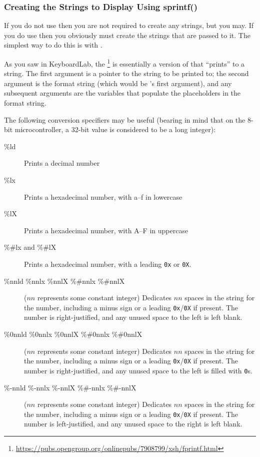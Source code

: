 \subsubsection{Creating the Strings to Display Using sprintf()}

If you do not use  then you are not required to create any strings, but you may.
If you do use  then you obviously must create the strings that are passed to it.
The simplest way to do this is with .

As you saw in KeyboardLab, the \footnote{\url{https://pubs.opengroup.org/onlinepubs/7908799/xsh/fprintf.html}} is essentially a version of  that ``prints'' to a string.
The first argument is a pointer to the string to be printed to; the second argument is the format string (which would be 's first argument), and any subsequent arguments are the variables that populate the placeholders in the format string.

The following conversion specifiers may be useful (bearing in mind that on the 8-bit microcontroller, a 32-bit value is considered to be a long integer):
\begin{description}
    \item[\%ld] Prints a decimal number
    \item[\%lx] Prints a hexadecimal number, with a--f in lowercase
    \item[\%lX] Prints a hexadecimal number, with A--F in uppercase
    \item[\%\#lx and \%\#lX] Prints a hexadecimal number, with a leading \lstinline{0x} or \lstinline{0X}.
    \item[\%nnld \%nnlx \%nnlX \%\#nnlx \%\#nnlX] ($nn$ represents some constant integer) Dedicates $nn$ spaces in the string for the number, including a minus sign or a leading \lstinline{0x}/\lstinline{0X} if present.
        The number is right-justified, and any unused space to the left is left blank.
    \item[\%0nnld \%0nnlx \%0nnlX \%\#0nnlx \%\#0nnlX] ($nn$ represents some constant integer) Dedicates $nn$ spaces in the string for the number, including a minus sign or a leading \lstinline{0x}/\lstinline{0X} if present.
        The number is right-justified, and any unused space to the left is filled with \lstinline{0}s.
    \item[\%-nnld \%-nnlx \%-nnlX \%\#-nnlx \%\#-nnlX] ($nn$ represents some constant integer) Dedicates $nn$ spaces in the string for the number, including a minus sign or a leading \lstinline{0x}/\lstinline{0X} if present.
        The number is left-justified, and any unused space to the right is left blank.
\end{description}

